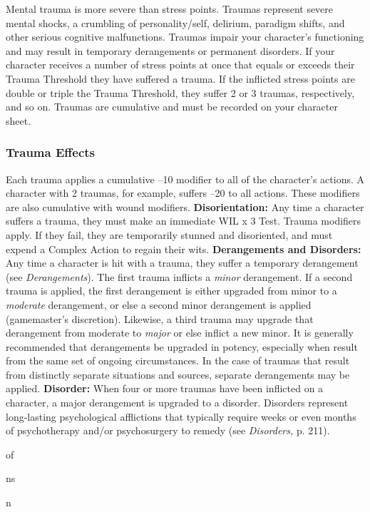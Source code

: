Mental trauma is more severe than stress points. Traumas
represent severe mental shocks, a crumbling of
personality/self, delirium, paradigm shifts, and other 
serious cognitive malfunctions. Traumas impair your 
character's functioning and may result in temporary 
derangements or permanent disorders.
If your character receives a number of stress points 
at once that equals or exceeds their Trauma Threshold
they have suffered a trauma. If the inflicted stress
points are double or triple the Trauma Threshold, they 
suffer 2 or 3 traumas, respectively, and so on. Traumas
are cumulative and must be recorded on your
character sheet.

\subsubsection{Trauma Effects}

Each trauma applies a cumulative –10 modifier to all 
of the character's actions. A character with 2 traumas, 
for example, suffers –20 to all actions. These modifiers 
are also cumulative with wound modifiers.
\textbf{Disorientation:} Any time a character suffers a 
trauma, they must make an immediate WIL x 3 Test. 
Trauma modifiers apply. If they fail, they are temporarily
stunned and disoriented, and must expend a
Complex Action to regain their wits.
\textbf{Derangements and Disorders:} Any time a character 
is hit with a trauma, they suffer a temporary derangement
(see \textit{Derangements}). The first trauma inflicts a
\textit{minor} derangement. If a second trauma is applied, 
the first derangement is either upgraded from minor 
to a \textit{moderate }derangement, or else a second minor 
derangement is applied (gamemaster's discretion). 
Likewise, a third trauma may upgrade that derangement
from moderate to \textit{major} or else inflict a new
minor. It is generally recommended that derangements 
be upgraded in potency, especially when result from 
the same set of ongoing circumstances. In the case of 
traumas that result from distinctly separate situations 
and sources, separate derangements may be applied.
\textbf{Disorder:} When four or more traumas have been 
inflicted on a character, a major derangement is upgraded
to a disorder. Disorders represent long-lasting
psychological afflictions that typically require weeks 
or even months of psychotherapy and/or psychosurgery
to remedy (see \textit{Disorders,} p. 211).

of 

ns 

n

